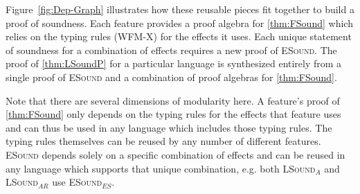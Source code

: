 Figure~\ref{fig:Dep-Graph} illustrates how these reusable pieces fit
together to build a proof of soundness. Each feature provides a proof
algebra for \ref{thm:FSound} which relies on the typing rules
(\textsc{WFM-X}) for the effects it uses. Each unique statement of
soundness for a combination of effects requires a new proof of
\textsc{ESound}. The proof of \ref{thm:LSoundP} for a particular
language is synthesized entirely from a single proof of
\textsc{ESound} and a combination of proof algebras for
\ref{thm:FSound}.

Note that there are several dimensions of modularity here. A feature's
proof of \ref{thm:FSound} only depends on the typing rules for the
effects that feature uses and can thus be used in any language which
includes those typing rules. The typing rules themselves can be reused
by any number of different features. \textsc{ESound} depends solely on
a specific combination of effects and can be reused in any language
which supports that unique combination, e.g. both
\textsc{LSound$_{A}$} and \textsc{LSound$_{AR}$} use
\textsc{ESound$_{ES}$}.






